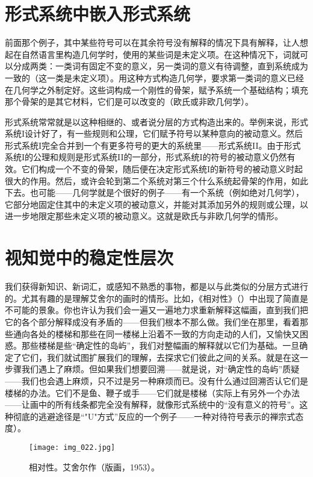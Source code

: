 \section{形式系统中嵌入形式系统}

前面那个例子，其中某些符号可以在其余符号没有解释的情况下具有解释，让人想起在自然语言里构造几何学时，使用的某些词是未定义项。在这种情况下，词就可以分成两类：一类词有固定不变的意义，另一类词的意义有待调整，直到系统成为一致的（这一类是未定义项）。用这种方式构造几何学，要求第一类词的意义已经在几何学之外制定好。这些词构成一个刚性的骨架，赋予系统一个基础结构；填充那个骨架的是其它材料，它们是可以改变的（欧氏或非欧几何学）。

形式系统常常就是以这种相继的、或者说分层的方式构造出来的。举例来说，形式系统I设计好了，有一些规则和公理，它们赋予符号以某种意向的被动意义。然后形式系统I完全合并到一个有更多符号的更大的系统里——形式系统II。由于形式系统I的公理和规则是形式系统II的一部分，形式系统I的符号的被动意义仍然有效。它们构成一个不变的骨架，随后便在决定形式系统I的新符号的被动意义时起很大的作用。然后，或许会轮到第二个系统对第三个什么系统起骨架的作用，如此下去。也可能——几何学就是个很好的例子——有一个系统（例如绝对几何学），它部分地固定住其中的未定义项的被动意义，并能对其添加另外的规则或公理，以进一步地限定那些未定义项的被动意义。这就是欧氏与非欧几何学的情形。

\section{视知觉中的稳定性层次}

我们获得新知识、新词汇，或感知不熟悉的事物，都是以与此类似的分层方式进行的。尤其有趣的是理解艾舍尔的画时的情形。比如，《相对性》（）中出现了简直是不可能的景象。你也许认为我们会一遍又一遍地力求重新解释这幅画，直到我们把它的各个部分解释成没有矛盾的——但我们根本不那么做。我们坐在那里，看着那些通向各处的楼梯和那些在同一楼梯上沿着不一致的方向走动的人们，又愉快又困惑。那些楼梯是些“确定性的岛屿”，我们对整幅画的解释就以它们为基础。一旦确定了它们，我们就试图扩展我们的理解，去探求它们彼此之间的关系。就是在这一步骤我们遇上了麻烦。但如果我们想要回溯——就是说，对“确定性的岛屿”质疑——我们也会遇上麻烦，只不过是另一种麻烦而已。没有什么通过回溯否认它们是楼梯的办法。它们不是鱼、鞭子或手——它们就是楼梯（实际上有另外一个办法——让画中的所有线条都完全没有解释，就像形式系统中的“没有意义的符号”。这种彻底的逃避途径是“"U"方式”反应的一个例子——一种对待符号表示的禅宗式态度）。

\begin{figure}
\texttt{[image: img\_022.jpg]}
\caption[相对性，艾舍尔作。]
  {相对性。艾舍尔作（版画，1953）。}
\end{figure}


